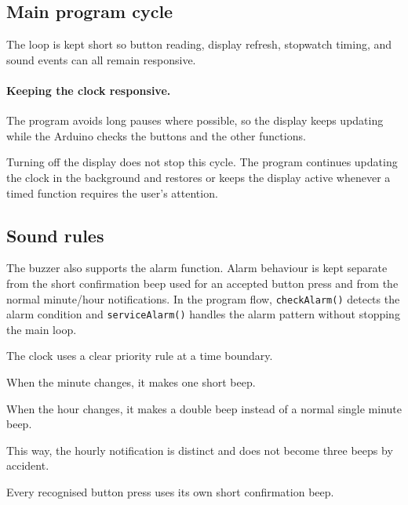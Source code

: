 \documentclass[12pt,letterpaper]{article}
\begin{document}
\subsection*{Main program cycle}

The loop is kept short so button reading,
display refresh,
stopwatch timing,
and sound events can all remain responsive.

\paragraph{Keeping the clock responsive.}

The program avoids long pauses where possible, so the display
keeps updating while the Arduino checks the buttons and the
other functions.

Turning off the display does not stop this cycle. The program
continues updating the clock in the background and restores or
keeps the display active whenever a timed function requires the
user's attention.

\iffalse
\subsection{Sound rules}

The buzzer also supports the alarm function. Alarm behaviour is kept separate
from the short confirmation beep used for an accepted button press and from
the normal minute/hour notifications. In the program flow, \texttt{checkAlarm()}
detects the alarm condition and \texttt{serviceAlarm()} handles the alarm
pattern without stopping the main loop.

The clock uses a clear priority rule
at a time boundary.

When the minute changes,
it makes one short beep.

When the hour changes,
it makes a double beep
instead of a normal single minute beep.

This way,
the hourly notification is distinct
and does not become three beeps by accident.

Every recognised button press uses
its own short confirmation beep.
\end{document}

